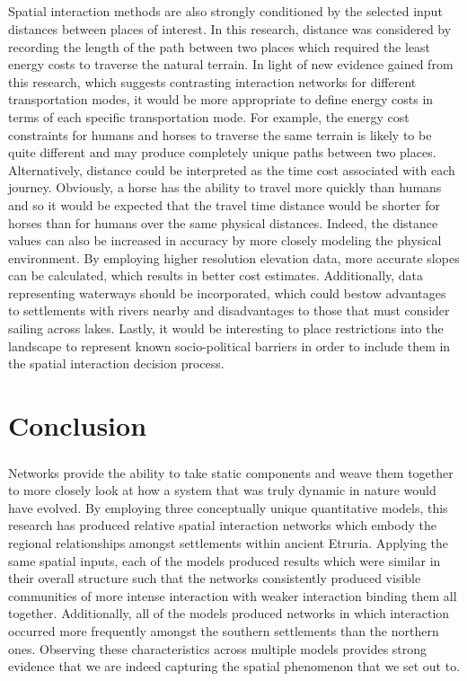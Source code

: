 \documentclass[12pt,a4paper]{thesis}
\begin{document}
\paragraph{}
Spatial interaction methods are also strongly conditioned by the selected input distances between places of interest. In this research, distance was considered by recording the length of the path between two places which required the least energy costs to traverse the natural terrain. In light of new evidence gained from this research, which suggests contrasting interaction networks for different transportation modes, it would be more appropriate to define energy costs in terms of each specific transportation mode. For example, the energy cost constraints for humans and horses to traverse the same terrain is likely to be quite different and may produce completely unique paths between two places. Alternatively, distance could be interpreted as the time cost associated with each journey. Obviously, a horse has the ability to travel more quickly than humans and so it would be expected that the travel time distance would be shorter for horses than for humans over the same physical distances. Indeed, the distance values can also be increased in accuracy by more closely modeling the physical environment. By employing higher resolution elevation data, more accurate slopes can be calculated, which results in better cost estimates. Additionally, data representing waterways should be incorporated, which could bestow advantages to settlements with rivers nearby and disadvantages to those that must consider sailing across lakes. Lastly, it would be interesting to place restrictions into the landscape to represent known socio-political barriers in order to include them in the spatial interaction decision process.  



\chapter{Conclusion}

\paragraph{}
Networks provide the ability to take static components and weave them together to more closely look at how a system that was truly dynamic in nature would have evolved. By employing three conceptually unique quantitative models, this research has produced relative spatial interaction networks which embody the regional relationships amongst settlements within ancient Etruria. Applying the same spatial inputs, each of the models produced results which were similar in their overall structure such that the networks consistently produced visible communities of more intense interaction with weaker interaction binding them all together. Additionally, all of the models produced networks in which interaction occurred more frequently amongst the southern settlements than the northern ones. Observing these characteristics across multiple models provides strong evidence that we are indeed capturing the spatial phenomenon that we set out to.     
\end{document}
